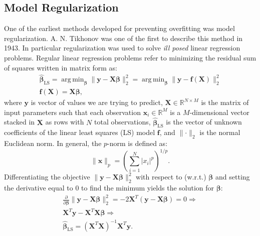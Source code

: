 \documentclass[a4paper, twoside, nobib]{tufte-book}
\newcommand{\abs}[1]{\lvert#1\rvert}
\newcommand{\norm}[1]{\lVert#1\rVert}
\renewcommand{\vec}[1]{\mathbf{#1}}
\DeclareMathOperator*{\argmin}{arg\,min} %
\begin{document}
\subsection{Model Regularization}
\label{subsec:regularization}
One of the earliest methods developed for preventing overfitting was model regularization. A. N. Tikhonov \citep{tikhonovStabilityInverseProblems1943} was one of the first to describe this method in \num{1943}. In particular regularization was used to solve \emph{ill posed} linear regression problems. Regular linear regression problems refer to minimizing the residual sum of squares written in matrix form as:
\begin{equation}
  \begin{split}
    \hat{\bm{\beta}}_{\mathrm{LS}} = \argmin_{\bm{\beta}} \norm{\vec{y} - \vec{X} \bm{\beta} }_2^2 = \argmin_{\bm{\beta}} \norm{ \vec{y} - \vec{f}(\vec{X}) }_2^2 \\
    \vec{f}(\vec{X}) = \vec{X} \bm{\beta},
  \end{split}
\end{equation}
where $\vec{y}$ is vector of values we are trying to predict, $\vec{X}\in\mathbb{R}^{N\times M}$ is the matrix of input parameters such that each observation $\vec{x}_i \in \mathbb{R}^M$ is a $M$-dimensional vector stacked in $\vec{X}$ as rows with $N$ total observations, $\hat{\bm{\beta}}_{\mathrm{LS}}$ is the vector of unknown coefficients of the linear least squares (LS) model $\vec{f}$, and $\norm{ \bm{\cdot} }_2$ is the normal Euclidean norm. In general, the $p$-norm is defined as:
\begin{equation}
  \norm{\vec{x}}_p = \left( \sum_{i=1}^N \abs{x_i}^p \right)^{1/p}.
\end{equation}
Differentiating the objective $\norm{\vec{y} - \vec{X} \bm{\beta} }_2^2$ with respect to (w.r.t.) $\bm{\beta}$ and setting the derivative equal to $0$ to find the minimum yields the solution for $\bm{\beta}$:
\begin{equation}
  \begin{split}
    \frac{\partial}{\partial \bm{\beta}} \norm{\vec{y} - \vec{X} \bm{\beta} }_2^2 = -2 \vec{X}^T \left( \vec{y} - \vec{X} \bm{\beta} \right) = 0  \Rightarrow \\
    \vec{X}^T \vec{y} - \vec{X}^T \vec{X} \bm{\beta} \Rightarrow \\
    \hat{\bm{\beta}}_{\mathrm{LS}} =  \left( \vec{X}^T \vec{X} \right)^{-1} \vec{X}^T \vec{y}.
  \end{split}
\end{equation}
\end{document}
